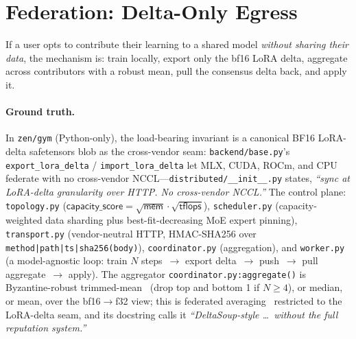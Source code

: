 \documentclass[11pt]{article}
\begin{document}
\section{Federation: Delta-Only Egress}
\label{sec:fed}

If a user opts to contribute their learning to a shared model \emph{without sharing their data}, the mechanism is: train locally, export only the bf16 LoRA delta, aggregate across contributors with a robust mean, pull the consensus delta back, and apply it.

\paragraph{Ground truth.}
In \texttt{zen/gym} (Python-only), the load-bearing invariant is a canonical BF16 LoRA-delta safetensors blob as the cross-vendor seam: \texttt{backend/base.py}'s \texttt{export\_lora\_delta} / \texttt{import\_lora\_delta} let MLX, CUDA, ROCm, and CPU federate with no cross-vendor NCCL---\texttt{distributed/\_\_init\_\_.py} states, \emph{``sync at LoRA-delta granularity over HTTP. No cross-vendor NCCL.''} The control plane: \texttt{topology.py} ($\textsf{capacity\_score} = \sqrt{\textsf{mem}}\cdot\sqrt{\textsf{tflops}}$), \texttt{scheduler.py} (capacity-weighted data sharding plus best-fit-decreasing MoE expert pinning), \texttt{transport.py} (vendor-neutral HTTP, HMAC-SHA256 over \texttt{method|path|ts|sha256(body)}), \texttt{coordinator.py} (aggregation), and \texttt{worker.py} (a model-agnostic loop: train $N$ steps~$\to$ export delta~$\to$ push~$\to$ pull aggregate~$\to$ apply). The aggregator \texttt{coordinator.py:aggregate()} is Byzantine-robust trimmed-mean~\cite{trimmedmean} (drop top and bottom 1 if $N\ge 4$), or median, or mean, over the bf16$\to$f32 view; this is federated averaging~\cite{fedavg} restricted to the LoRA-delta seam, and its docstring calls it \emph{``DeltaSoup-style \ldots\ without the full reputation system.''}
\end{document}
